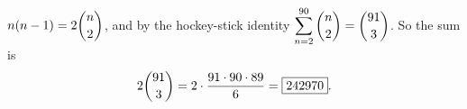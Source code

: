 $n(n-1)=2\dbinom n2$, and by the hockey-stick identity $\displaystyle\sum_{n=2}^{90}\dbinom n2=\dbinom{91}{3}$. So the sum is
\[2\dbinom{91}{3}=2\cdot\dfrac{91\cdot90\cdot89}{6}=\boxed{242970}.\]
